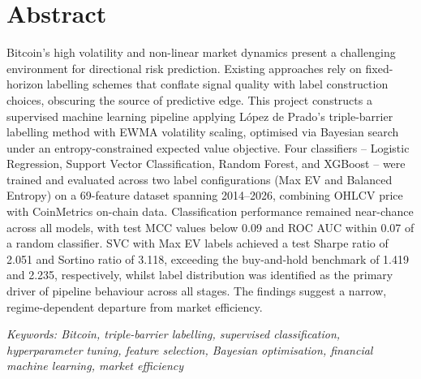 
\section*{Abstract}
\vspace{2cm}
Bitcoin's high volatility and non-linear market dynamics present a challenging environment for directional risk prediction. Existing approaches rely on fixed-horizon labelling schemes that conflate signal quality with label construction choices, obscuring the source of predictive edge. This project constructs a supervised machine learning pipeline applying López de Prado's triple-barrier labelling method with EWMA volatility scaling, optimised via Bayesian search under an entropy-constrained expected value objective. Four classifiers -- Logistic Regression, Support Vector Classification, Random Forest, and XGBoost -- were trained and evaluated across two label configurations (Max EV and Balanced Entropy) on a 69-feature dataset spanning 2014--2026, combining OHLCV price with CoinMetrics on-chain data. Classification performance remained near-chance across all models, with test MCC values below 0.09 and ROC AUC within 0.07 of a random classifier. SVC with Max EV labels achieved a test Sharpe ratio of 2.051 and Sortino ratio of 3.118, exceeding the buy-and-hold benchmark of 1.419 and 2.235, respectively, whilst label distribution was identified as the primary driver of pipeline behaviour across all stages. The findings suggest a narrow, regime-dependent departure from market efficiency.\\

\vspace{1cm}

\noindent \textit{Keywords: Bitcoin, triple-barrier labelling, supervised classification, hyperparameter tuning, feature selection, Bayesian optimisation, financial machine learning, market efficiency}